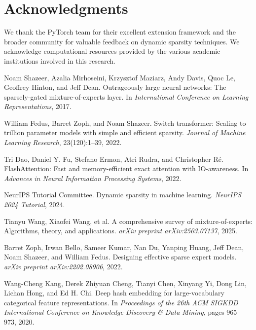 \documentclass{article}
\numberwithin{equation}{section}
\theoremstyle{plain}
\theoremstyle{definition}
\theoremstyle{remark}
\begin{document}
\section*{Acknowledgments}

We thank the PyTorch team for their excellent extension framework and the broader community for valuable feedback on dynamic sparsity techniques. We acknowledge computational resources provided by the various academic institutions involved in this research.

%


\begin{thebibliography}{99}

Noam Shazeer, Azalia Mirhoseini, Krzysztof Maziarz, Andy Davis, Quoc Le, Geoffrey Hinton, and Jeff Dean.
\newblock Outrageously large neural networks: The sparsely-gated mixture-of-experts layer.
\newblock In \emph{International Conference on Learning Representations}, 2017.

William Fedus, Barret Zoph, and Noam Shazeer.
\newblock Switch transformer: Scaling to trillion parameter models with simple and efficient sparsity.
\newblock \emph{Journal of Machine Learning Research}, 23(120):1--39, 2022.

Tri Dao, Daniel Y. Fu, Stefano Ermon, Atri Rudra, and Christopher Ré.
\newblock FlashAttention: Fast and memory-efficient exact attention with IO-awareness.
\newblock In \emph{Advances in Neural Information Processing Systems}, 2022.

NeurIPS Tutorial Committee.
\newblock Dynamic sparsity in machine learning.
\newblock \emph{NeurIPS 2024 Tutorial}, 2024.

Tianyu Wang, Xiaofei Wang, et al.
\newblock A comprehensive survey of mixture-of-experts: Algorithms, theory, and applications.
\newblock \emph{arXiv preprint arXiv:2503.07137}, 2025.

Barret Zoph, Irwan Bello, Sameer Kumar, Nan Du, Yanping Huang, Jeff Dean, Noam Shazeer, and William Fedus.
\newblock Designing effective sparse expert models.
\newblock \emph{arXiv preprint arXiv:2202.08906}, 2022.

Wang-Cheng Kang, Derek Zhiyuan Cheng, Tianyi Chen, Xinyang Yi, Dong Lin, Lichan Hong, and Ed H. Chi.
\newblock Deep hash embedding for large-vocabulary categorical feature representations.
\newblock In \emph{Proceedings of the 26th ACM SIGKDD International Conference on Knowledge Discovery \& Data Mining}, pages 965--973, 2020.


\end{thebibliography}
\end{document}
